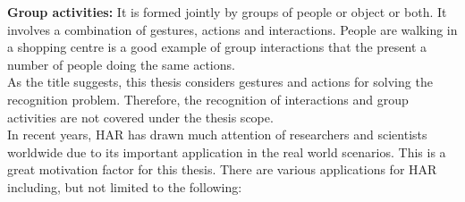 \textbf{Group activities:} It is formed jointly by groups of people or object or both. It involves a combination of gestures, actions and interactions. People are walking in a shopping centre is a good example of group interactions that the present a number of people doing the same actions.\\

As the title suggests, this thesis considers gestures and actions for solving the recognition problem. Therefore, the recognition of interactions and group activities are not covered under the thesis scope.\\

In recent years, HAR has drawn much attention of researchers and scientists worldwide due to its important application in the real world scenarios. This is a great motivation factor for this thesis. There are various applications for HAR including, but not limited to the following:\\
